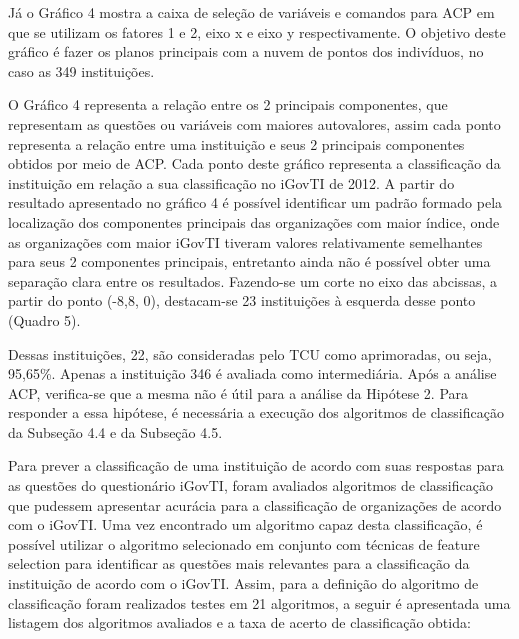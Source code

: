 Já o Gráfico 4 mostra a caixa de seleção de variáveis e comandos para ACP em que se utilizam os fatores 1 e 2, eixo x e eixo y respectivamente. O objetivo deste gráfico é fazer os planos principais com a nuvem de pontos dos indivíduos, no caso as 349 instituições.  

O Gráfico 4 representa a relação entre os 2 principais componentes, que representam as questões ou variáveis com maiores autovalores, assim cada ponto representa a relação entre uma instituição e seus 2 principais componentes obtidos por meio de ACP. Cada ponto deste gráfico representa a classificação da instituição em relação a sua classificação no iGovTI de 2012. A partir do resultado apresentado no gráfico 4 é possível identificar um padrão formado pela localização dos componentes principais das organizações com maior índice, onde as organizações com maior iGovTI tiveram valores relativamente semelhantes para seus 2 componentes principais, entretanto ainda não é possível obter uma separação clara entre os resultados. Fazendo-se um corte no eixo das abcissas, a partir do ponto (-8,8, 0), destacam-se 23 instituições à esquerda desse ponto (Quadro 5). 

Dessas instituições, 22, são consideradas pelo TCU como aprimoradas, ou seja, 95,65\%. Apenas a instituição 346 é avaliada como intermediária.
Após a análise ACP, verifica-se que a mesma não é útil para a análise da Hipótese 2. Para responder a essa hipótese, é necessária a execução dos algoritmos de classificação da Subseção 4.4 e da Subseção 4.5.

Para prever a classificação de uma instituição de acordo com suas respostas para as questões do questionário iGovTI, foram avaliados algoritmos de classificação que pudessem apresentar acurácia para a classificação de organizações de acordo com o iGovTI. Uma vez encontrado um algoritmo capaz desta classificação, é possível utilizar o algoritmo selecionado em conjunto com técnicas de feature selection para identificar as questões mais relevantes para a classificação da instituição de acordo com o iGovTI.
Assim, para a definição do algoritmo de classificação foram realizados testes em 21 algoritmos, a seguir é apresentada uma listagem dos algoritmos avaliados e a taxa de acerto de classificação obtida: 

